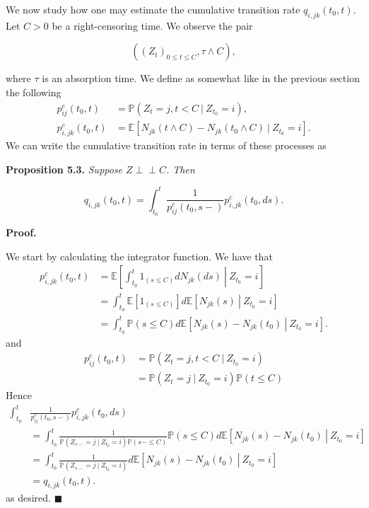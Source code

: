 \documentclass[a4paper,10pt,openany]{book}
\begin{document}
We now study how one may estimate the cumulative transition rate \(q_{i,jk}(t_0,t)\). Let \(C>0\) be a right-censoring time. We observe the pair

\[
((Z_t)_{0\le t\le C},\tau \wedge C),
\]

where \(\tau\) is an absorption time. We define as somewhat like in the previous section the following
\begin{align*}
p_{ij}^c(t_0,t)&=\mathbb P(Z_t=j, t<C\ \vert\ Z_{t_0}=i),\\
p_{i,jk}^c(t_0,t)&=\mathbb E[N_{jk}(t\wedge C)-N_{jk}(t_0\wedge C)\ \vert\ Z_{t_0}=i].
\end{align*}
We can write the cumulative transition rate in terms of these processes as

\textbf{Proposition 5.3.} \emph{Suppose \(Z\perp\!\!\!\perp C\). Then}

\[
q_{i,jk}(t_0,t)=\int_{t_0}^t\frac{1}{p_{ij}^c(t_0,s-)}p_{i,jk}^c(t_0,ds).
\]

\textbf{Proof.}

We start by calculating the integrator function. We have that
\begin{align*}
p_{i,jk}^c(t_0,t)&=\mathbb E\left[\left.\int_{t_0}^t 1_{(s\le C)}dN_{jk}(ds)\ \right\vert\ Z_{t_0}=i\right]\\
&=\int_{t_0}^t \mathbb E\left[1_{(s\le C)}\right]d\mathbb E\left[\left.N_{jk}(s)\ \right\vert\ Z_{t_0}=i\right]\\
&=\int_{t_0}^t \mathbb P(s\le C) d\mathbb E\left[\left.N_{jk}(s)-N_{jk}(t_0)\ \right\vert\ Z_{t_0}=i\right].
\end{align*}
and
\begin{align*}
p_{ij}^c(t_0,t)&=\mathbb P(Z_t=j, t<C\ \vert\ Z_{t_0}=i)\\
&=\mathbb P(Z_t=j\ \vert\ Z_{t_0}=i)\mathbb P(t\le C)
\end{align*}
Hence
\begin{align*}
\int_{t_0}^t&\frac{1}{p_{ij}^c(t_0,s-)}p_{i,jk}^c(t_0,ds)\\
&=\int_{t_0}^t\frac{1}{\mathbb P(Z_{s-}=j\ \vert\ Z_{t_0}=i)\mathbb P(s-\le C)}\mathbb P(s\le C) d\mathbb E\left[\left.N_{jk}(s)-N_{jk}(t_0)\ \right\vert\ Z_{t_0}=i\right]\\
&=\int_{t_0}^t\frac{1}{\mathbb P(Z_{s-}=j\ \vert\ Z_{t_0}=i)} d\mathbb E\left[\left.N_{jk}(s)-N_{jk}(t_0)\ \right\vert\ Z_{t_0}=i\right]\\
&=q_{i,jk}(t_0,t).
\end{align*}
as desired. \(\blacksquare\)
\end{document}
